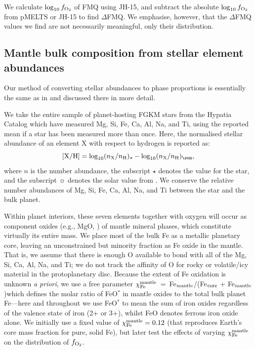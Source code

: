 \documentclass[fleqn,usenatbib,twocolumn]{mnras}
\newcommand{\fo}{$f_{\ce{O2}}$}
\newcommand{\xcore}{Fe$_{\rm mantle}$/(Fe$_{\rm core}$ + Fe$_{\rm mantle}$)}
\begin{document}
We calculate $\log_{10} f_{\ce{O2}}$ of FMQ using JH-15, and subtract the absolute $\log_{10} f_{\ce{O2}}$ from pMELTS or JH-15 to find $\Delta$FMQ. We emphasise, however, that the $\Delta$FMQ values we find are not necessarily meaningful, only their distribution.

\subsection{Mantle bulk composition from stellar element abundances}\label{sec:methods-bulkcomp}

Our method of converting stellar abundances to phase proportions is essentially the same as in \citet{guimond_mantle_2023} and discussed there in more detail. 

We take the entire sample of planet-hosting FGKM stars from the Hypatia Catalog \citep{hinkel_stellar_2014} which have measured Mg, Si, Fe, Ca, Al, Na, and Ti, using the reported mean if a star has been measured more than once. Here, the normalised stellar abundance of an element X with respect to hydrogen is reported as:
\begin{equation}\label{eq:nH_star}
    {\rm [X/H]} = \log_{10}(n_{\rm X}/n_{\rm H})_{\star} - \log_{10}(n_{\rm X}/n_{\rm H})_{\sun},
\end{equation}
where $n$ is the number abundance, the subscript $\star$ denotes the value for the star, and the subscript $\sun$ denotes the solar value from \citet{lodders_abundances_2009}. We conserve the relative number abundances of Mg, Si, Fe, Ca, Al, Na, and Ti between the star and the bulk planet.

Within planet interiors, these seven elements together with oxygen will occur as component oxides (e.g., MgO, ) of mantle mineral phases, which constitute virtually its entire mass. We place most of the bulk Fe as a metallic planetary core, leaving an unconstrained but minority fraction as Fe oxide in the mantle. That is, we assume that there is enough O available to bond with all of the Mg, Si, Ca, Al, Na, and Ti; we do not track the affinity of O for rocky or volatile/icy material in the protoplanetary disc. Because the extent of Fe oxidation is unknown \textit{a priori}, we use a free parameter $\chi_{\rm Fe}^{\rm mantle}$~=~\xcore\;which defines the molar ratio of FeO$^*$ in mantle oxides to the total bulk planet Fe---here and throughout we use FeO$^*$ to mean the sum of iron oxides regardless of the valence state of iron (2+ or 3+), whilst FeO denotes ferrous iron oxide alone. We initially use a fixed value of $\chi_{\rm Fe}^{\rm mantle} = 0.12$ (that reproduces Earth's core mass fraction for pure, solid Fe), but later test the effects of varying $\chi_{\rm Fe}^{\rm mantle}$ on the distribution of \fo.
\end{document}
